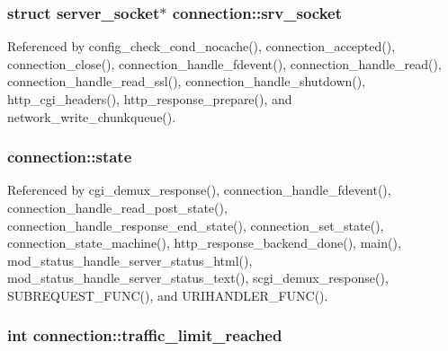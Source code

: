\hypertarget{structconnection_a3735b8160fe578295774457191c06244}{
\subsubsection[{srv\-\_\-socket}]{\setlength{\rightskip}{0pt plus 5cm}struct {\bf server\-\_\-socket}$\ast$ connection\-::srv\-\_\-socket}}\label{structconnection_a3735b8160fe578295774457191c06244}


Referenced by config\-\_\-check\-\_\-cond\-\_\-nocache(), connection\-\_\-accepted(), connection\-\_\-close(), connection\-\_\-handle\-\_\-fdevent(), connection\-\_\-handle\-\_\-read(), connection\-\_\-handle\-\_\-read\-\_\-ssl(), connection\-\_\-handle\-\_\-shutdown(), http\-\_\-cgi\-\_\-headers(), http\-\_\-response\-\_\-prepare(), and network\-\_\-write\-\_\-chunkqueue().

\hypertarget{structconnection_aaa1da90a3bf944e556dcf5ad7d69a20d}{
\subsubsection[{state}]{ connection\-::state}}\label{structconnection_aaa1da90a3bf944e556dcf5ad7d69a20d}


Referenced by cgi\-\_\-demux\-\_\-response(), connection\-\_\-handle\-\_\-fdevent(), connection\-\_\-handle\-\_\-read\-\_\-post\-\_\-state(), connection\-\_\-handle\-\_\-response\-\_\-end\-\_\-state(), connection\-\_\-set\-\_\-state(), connection\-\_\-state\-\_\-machine(), http\-\_\-response\-\_\-backend\-\_\-done(), main(), mod\-\_\-status\-\_\-handle\-\_\-server\-\_\-status\-\_\-html(), mod\-\_\-status\-\_\-handle\-\_\-server\-\_\-status\-\_\-text(), scgi\-\_\-demux\-\_\-response(), S\-U\-B\-R\-E\-Q\-U\-E\-S\-T\-\_\-\-F\-U\-N\-C(), and U\-R\-I\-H\-A\-N\-D\-L\-E\-R\-\_\-\-F\-U\-N\-C().

\hypertarget{structconnection_a5fa0f8dc5c0b893683b4b092be217f50}{
\subsubsection[{traffic\-\_\-limit\-\_\-reached}]{\setlength{\rightskip}{0pt plus 5cm}int connection\-::traffic\-\_\-limit\-\_\-reached}}\label{structconnection_a5fa0f8dc5c0b893683b4b092be217f50}


